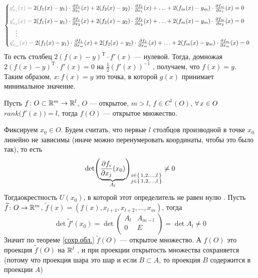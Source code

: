 \begin{prf}
\[\begin{cases}
		\uns{g'_{x_1}(x) ={}} 2(f_1(x) - y_1) \cdot \pfrac{f_1}{x_1}(x) + 2(f_2(x) - y_2) \cdot \pfrac{f_2}{x_1}(x) + \ldots + 2(f_m(x) - y_m) \cdot \pfrac{f_m}{x_1}(x) = 0\\[8pt]
		\uns{g'_{x_2}(x) ={}} 2(f_1(x) - y_1) \cdot \pfrac{f_1}{x_2}(x) + 2(f_2(x) - y_2) \cdot \pfrac{f_2}{x_2}(x) + \ldots + 2(f_m(x) - y_m) \cdot \pfrac{f_m}{x_2}(x) = 0\\[3pt] \quad \vdots\\
		\uns{g'_{x_m}(x) ={}}2(f_1(x) - y_1) \cdot \pfrac{f_1}{x_m}(x) + 2(f_2(x) - y_2) \cdot \pfrac{f_2}{x_m}(x) + \ldots + 2(f_m(x) - y_m) \cdot \pfrac{f_m}{x_m}(x) = 0 \\
	\end{cases}\]
	То есть столбец $2(f(x) - y)^{\mathrm T} \cdot f'(x)$ --- нулевой. Тогда, домножая $2(f(x) - y)^{\mathrm T} \cdot f'(x) = 0$ на $\frac12(f'(x))^{-1}$ , получаем, что $f(x) = y$. Таким образом, $x : f(x) = y$ это точка, в которой $g(x)$ принимает минимальное значение.
\end{prf}

\begin{slv}[https://www.youtube.com/live/Ebv-BznzM6k?si=daWzbbhBembXmSqh&t=3329]
	Пусть $f \colon O \subset \mathbb R^m \to \mathbb R^l$, $O$ --- открытое, $m > l$, $f \in C^1(O)$, $\forall \, x \in O$ $rank\bigl(f'(x)\bigr) = l$\smallskip, тогда $f(O)$ --- открытое множество.
\end{slv}

\begin{prf}
	Фиксируем $x_0 \in O$. Будем считать, что первые $l$ столбцов производной в точке $x_0$ линейно не зависимы (иначе можно перенумеровать координаты, чтобы это было так), то есть 
	\[\det \Biggl(\underbrace{\frac{\partial f_i}{\partial x_j} (x_0)}_{A_l}\Biggr)_{\substack{i \in \{\,1, 2, \ldots, l \, \} \\ j \in \{\,1, 2, \ldots, l \, \}}} \ne 0\]
	 Тогда\!\E окрестность $U(x_0)$, в которой этот определитель не равен нулю . Пусть $\widetilde f \colon O \to \mathbb R^m$, $\widetilde f(x) = (f(x), x_{l + 1}, x_{l + 2}, \ldots, x_{m})$, тогда\linebreak
	 \[ \det \widetilde f'(x_0) = \det \begin{pmatrix}
	 	A_l & A_{m-l}\\
	 	0 & E\\
	 \end{pmatrix} = \det A_l \ne 0\]
	 Значит по теореме \ref{сохр.обл.} $\widetilde f(O)$ --- открытое множество. А $f(O)$ это проекция $\widetilde f(O)$ на $\mathbb R^l$ , и при проекции открытость множества сохраняется (потому что проекция шара это шар и если $B \subset A$, то проекция $B$ содержится в проекции $A$)
\end{prf}
\pagebreak


